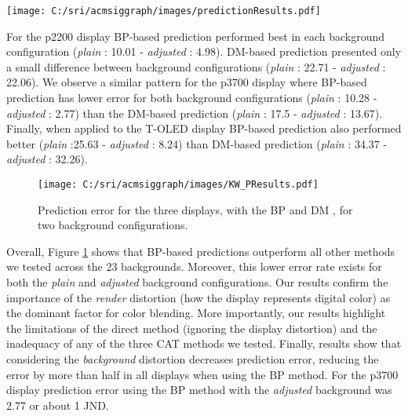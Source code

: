 \documentclass[annual]{acmsiggraph}
\begin{document}
\begin{figure*}[ht]
  \centering
  \texttt{[image: C:/sri/acmsiggraph/images/predictionResults.pdf]}
  \caption{Prediction results of p2200, p3700 and T-OLED displays, with 5 prediction methods, in \textit{plain}  and \textit{adjusted}  bg configurations.}
  \label{fig:Figure7}
\end{figure*}

For the p2200 display BP-based prediction performed best in each background configuration (\textit{plain} : 10.01 - \textit{adjusted} : 4.98). DM-based prediction presented only a small difference between background configurations (\textit{plain} : 22.71 - \textit{adjusted} : 22.06). We observe a similar pattern for the p3700 display where BP-based prediction has lower error for both background configurations (\textit{plain} : 10.28 - \textit{adjusted} : 2.77) than the DM-based prediction (\textit{plain} : 17.5 - \textit{adjusted} : 13.67). Finally, when applied to the T-OLED display BP-based prediction also performed better (\textit{plain} :25.63 - \textit{adjusted} : 8.24) than DM-based prediction (\textit{plain} : 34.37 - \textit{adjusted} : 32.26).
\begin{figure}[ht]
  \centering
  \texttt{[image: C:/sri/acmsiggraph/images/KW\_PResults.pdf]}
  \caption{Prediction error for the three displays, with the BP and DM , for two background configurations.}
  \label{fig:Figure8}
\end{figure}

Overall, Figure \ref{fig:Figure8} shows that BP-based predictions outperform all other methods we tested across the 23 backgrounds. Moreover, this lower error rate exists for both the \textit{plain}  and \textit{adjusted}  background configurations. Our results confirm the importance of the \textit{render} distortion (how the display represents digital color) as the dominant factor for color blending. More importantly, our results highlight the limitations of the direct method (ignoring the display distortion) and the inadequacy of any of the three CAT methods we tested. Finally, results show that considering the \textit{background} distortion decreases prediction error, reducing the error by more than half in all displays when using the BP method. For the p3700 display prediction error using the BP method with the \textit{adjusted}  background was 2.77 or about 1 JND.
\end{document}
